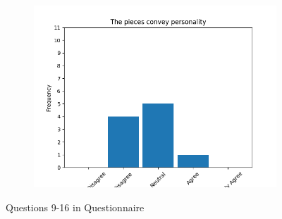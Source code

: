 \documentclass{article}
\begin{document}
\begin{figure}[!ht]
\begin{subfigure}{.5\textwidth}
    \includegraphics[width=\textwidth]{images/questions/15}
\end{subfigure}
\caption[short]{Questions 9-16 in Questionnaire}\label{fig:qmiddel}
\end{figure}
\end{document}
